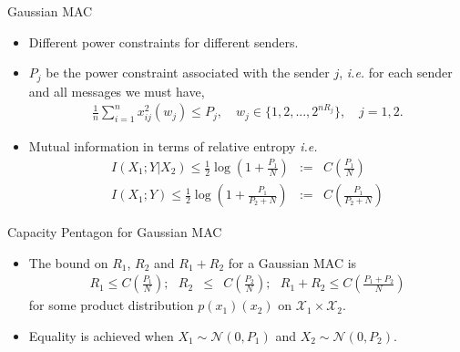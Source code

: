 \documentclass{beamer}
\begin{document}
{\begin{frame}{Gaussian MAC}
\begin{itemize}
	\end{itemize}
\end{frame}
\begin{frame}
 \begin{itemize}
	\justifying

\item<1-> Different power constraints for different senders.

\item<2-> $P_j$ be the power constraint associated with the sender $j$, \textit{i.e.} for each sender and all messages we must have,
%
\begin{eqnarray*}
    \frac{1}{n} \sum_{i = 1}^n x^2_{ij} (w_j) \leq P_j, \quad w_j \in \{1,2,...,2^{nR_j}\}, \quad j = 1,2.
\end{eqnarray*} 

\item<3-> Mutual information in terms of relative entropy \textit{i.e.}
%
\begin{eqnarray*}
    I(X_1;Y|X_2) \leq \frac{1}{2}\log(1+\frac{P_1}{N}) &:=& C\left(\frac{P_1}{N} \right) \\
    I(X_1;Y) \leq \frac{1}{2}\log(1+\frac{P_1}{P_2+N}) &:=& C\left(\frac{P_1}{P_2+N}\right)
\end{eqnarray*}
%

	\end{itemize}
\end{frame}
\begin{frame}{Capacity Pentagon for Gaussian MAC}
 \begin{itemize}
	\justifying

\item<1-> \begin{tcolorbox}[colback=blue!10, colframe=blue, title=Capacity Region of GMAC]
The bound on $R_1$, $R_2$ and $R_1+R_2$ for a Gaussian MAC is
%
\begin{eqnarray*}
    R_1 \leq C\left(\frac{P_1}{N}\right); \text{ } R_2 &\leq& C\left(\frac{P_2}{N}\right); \text{ }  R_1+R_2 \leq C\left(\frac{P_1+P_2}{N}\right)
\end{eqnarray*}
%
for some product distribution $p(x_1)(x_2)$ on $\mathcal{X}_1 \times \mathcal{X}_2$.
\end{tcolorbox}
%
\item<2-> Equality is achieved when $X_1 \sim \mathcal{N}(0,P_1)$ and $X_2 \sim \mathcal{N}(0,P_2)$.


\end{itemize}
\end{frame}}
\end{document}
